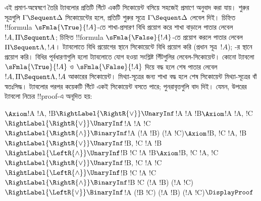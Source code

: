 \documentclass[../../../include/open-logic-section]{subfiles}
\begin{document}
এই প্রমাণ-অন্বেষণে তৈরি ট্যাবলোর প্রতিটি
গিঁটে একটি সিকোয়েন্ট বসিয়ে সহজেই
 প্রমাণে অনুবাদ করা যায়।
শুরুর সূত্রগুলি $\Gamma \Sequent
\Delta$ সিকোয়েন্টের হলে, প্রতিটি শুরুর
সূত্রে $\Gamma \Sequent
\Delta$ লেবেল দিই। চিহ্নিত
!!{formula} $\sFmla{\True}{!A}$-তে
শাখা-প্রসারণ বিধি প্রয়োগ করে শাখা বাড়ালে
পাতার লেবেল $!A, \Pi \Sequent \Lambda$;
চিহ্নিত !!{formula}
$\sFmla{\False}{!A}$-তে প্রয়োগ করলে
পাতার লেবেল $\Pi \Sequent
\Lambda, !A$। ট্যাবলোতে
\TRule{\True}{\star} বিধি প্রয়োগের
স্থানে সিকোয়েন্টে \LeftR{\star}
বিধি প্রয়োগ করি (প্রধান সূত্র~$!A$);
\TRule{\False}{\star}-র স্থানে
\RightR{\star} প্রয়োগ করি।
বিধির পূর্বধারণাগুলি হলো ট্যাবলোতে
যোগ হওয়া সংশ্লিষ্ট গিঁটগুলির
লেবেল-সিকোয়েন্ট। কোনো ট্যাবলো
$\sFmla{\True}{!A}$ ও
$\sFmla{\False}{!A}$ দিয়ে বদ্ধ হলে
শেষ পাতার লেবেল
$!A, \Pi \Sequent \Lambda,
!A$ আকারের সিকোয়েন্ট। মিথ্যা-সূত্রের জন্য শাখা বদ্ধ হলে
শেষ সিকোয়েন্ট মিথ্যা-সূত্রের বাঁ স্বতঃসিদ্ধ।
ট্যাবলোর পরপর কয়েকটি গিঁটে
একই সিকোয়েন্ট বসতে পারে;
পুনরাবৃত্তগুলি বাদ দিই।
যেমন, উপরের ট্যাবলো নিচের
!!{proof}-এ অনূদিত হয়:
\begin{maxwidth}
$
\Axiom$!A \fCenter !A, !B$
\RightLabel{\RightR{\lor}}
\UnaryInf$!A \fCenter !A \lor !B$
\Axiom$!A \fCenter !A, !C$
\RightLabel{\RightR{\lor}}
\UnaryInf$!A \fCenter !A \lor !C$
\RightLabel{\RightR{\land}}
\BinaryInf$!A \fCenter (!A \lor !B) \land (!A \lor !C)$
\Axiom$!B, !C \fCenter !A, !B$
\RightLabel{\RightR{\lor}}
\UnaryInf$!B, !C \fCenter !A \lor !B$
\RightLabel{\LeftR{\land}}
\UnaryInf$!B \land !C \fCenter !A \lor !B$
\Axiom$!B, !C \fCenter !A, !C$
\RightLabel{\RightR{\lor}}
\UnaryInf$!B, !C \fCenter !A \lor !C$
\RightLabel{\LeftR{\land}}
\UnaryInf$!B \land !C \fCenter !A \lor !C$
\RightLabel{\RightR{\land}}
\BinaryInf$!B \land !C \fCenter (!A \lor !B) \land
(!A \lor !C)$
\RightLabel{\LeftR{\lor}}
\BinaryInf$!A \lor (!B \land !C) \fCenter (!A \lor !B) \land
(!A \lor !C)$
\DisplayProof$
\end{maxwidth}
\end{document}
